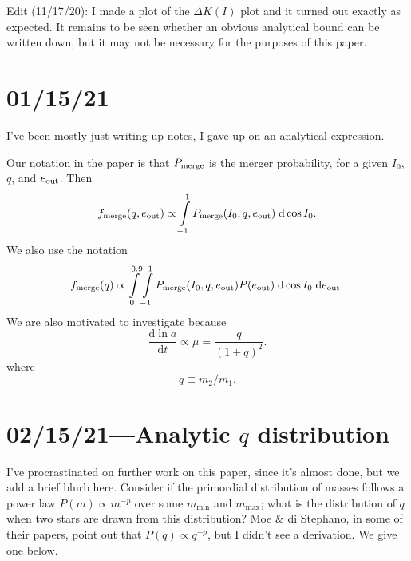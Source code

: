 \documentclass[11pt,
        usenames, %
        dvipsnames %
    ]{article}
\newcommand*{\rd}[2]{\frac{\mathrm{d}#1}{\mathrm{d}#2}}
\begin{document}
Edit (11/17/20): I made a plot of the $\Delta K(I)$ plot and it turned out
exactly as expected. It remains to be seen whether an obvious analytical bound
can be written down, but it may not be necessary for the purposes of this paper.

\section{01/15/21}

I've been mostly just writing up notes, I gave up on an analytical expression.

Our notation in the paper is that $P_{\rm merge}$ is the merger probability, for
a given $I_0$, $q$, and $e_{\rm out}$. Then
\begin{equation}
    f_{\rm merge}(q, e_{\rm out}) \propto
        \int\limits_{-1}^1 P_{\rm merge}(I_0, q, e_{\rm out})\;\mathrm{d}\cos
        I_0.
\end{equation}
We also use the notation
\begin{equation}
    f_{\rm merge}(q) \propto \int\limits_0^{0.9}\int\limits_{-1}^1 P_{\rm merge}(I_0,
        q, e_{\rm out}) P(e_{\rm out}) \;\mathrm{d}\cos I_0\;\mathrm{d}e_{\rm
        out}.
\end{equation}
We are also motivated to investigate because
\begin{equation}
    \rd{\ln a}{t} \propto \mu = \frac{q}{(1 + q)^2}.
\end{equation}
where
\begin{equation}
    q \equiv m_2 / m_1.
\end{equation}

\section{02/15/21---Analytic $q$ distribution}

I've procrastinated on further work on this paper, since it's almost done, but
we add a brief blurb here. Consider if the primordial distribution of masses
follows a power law $P(m) \propto m^{-p}$ over some $m_{\min}$ and
$m_{\max}$; what is the distribution of $q$ when two stars are drawn from this
distribution? Moe \& di Stephano, in some of their papers, point out that $P(q)
\propto q^{-p}$, but I didn't see a derivation. We give one below.
\end{document}
